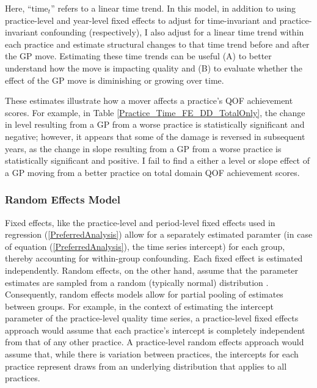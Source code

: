 \documentclass[11pt]{article}
\begin{document}
Here, ``$\textrm{time}_t$'' refers to a linear time trend. In this model, in addition to using practice-level and year-level fixed effects to adjust for time-invariant and practice-invariant confounding (respectively), I also adjust for a linear time trend within each practice and estimate structural changes to that time trend before and after the GP move. Estimating these time trends can be useful (A) to better understand how the move is impacting quality and (B) to evaluate whether the effect of the GP move is diminishing or growing over time.




These estimates illustrate how a mover affects a practice's QOF achievement scores. For example, in Table \ref{Practice_Time_FE_DD_TotalOnly}, the change in level resulting from a GP from a worse practice is statistically significant and negative; however, it appears that some of the damage is reversed in subsequent years, as the change in slope resulting from a GP from a worse practice is statistically significant and positive. I fail to find a either a level or slope effect of a GP moving from a better practice on total domain QOF achievement scores.

% 

%
\subsubsection{Random Effects Model}

Fixed effects, like the practice-level and period-level fixed effects used in regression (\ref{PreferredAnalysis}) allow for a separately estimated paramter (in case of equation (\ref{PreferredAnalysis}), the time series intercept) for each group, thereby accounting for within-group confounding. Each fixed effect is estimated independently. Random effects, on the other hand, assume that the parameter estimates are sampled from a random (typically normal) distribution \citep{uclainstitutefordigitalresearchandeducationIntroductionGeneralizedLinear, rabe-heskethMultilevelLongitudinalModeling2008}. Consequently, random effects models allow for partial pooling of estimates between groups. For example, in the context of estimating the intercept parameter of the practice-level quality time series, a practice-level fixed effects approach would assume that each practice's intercept is completely independent from that of any other practice. A practice-level random effects approach would assume that, while there is variation between practices, the intercepts for each practice represent draws from an underlying distribution that applies to all practices.
\end{document}
